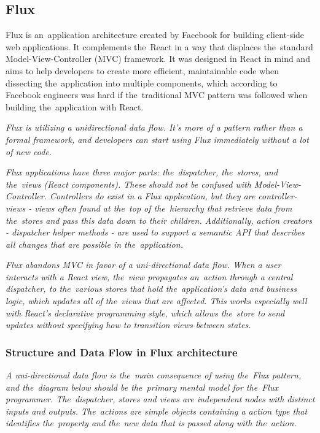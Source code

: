 \subsection{Flux}
Flux is an~application architecture created by Facebook for building client-side web applications. It complements the~React in a way that displaces the~standard Model-View-Controller (MVC) framework. It was designed in React in mind and aims to help developers to create more efficient, maintainable code when dissecting the~application into multiple components, which according to Facebook engineers was hard if the~traditional MVC pattern was followed when building the~application with React.\citep{gackenheimer}

\textsl{Flux is utilizing a unidirectional data flow. It's more of a pattern rather than a formal framework, and developers can start using Flux immediately without a lot of new code.} \citep{flux}

\textsl{Flux applications have three major parts: the~dispatcher, the~stores, and the~views (React components). These should not be confused with Model-View-Controller. Controllers do exist in a Flux application, but they are controller-views - views often found at the~top of the~hierarchy that retrieve data from the~stores and pass this data down to their children. Additionally, action creators - dispatcher helper methods - are used to support a semantic API that describes all changes that are possible in the~application.} \citep{flux}

\textsl{Flux abandons MVC in favor of a uni-directional data flow. When a user interacts with a React view, the~view propagates an~action through a central dispatcher, to the~various stores that hold the~application's data and business logic, which updates all of the~views that are affected. This works especially well with React's declarative programming style, which allows the~store to send updates without specifying how to transition views between states.} \citep{flux}

\subsubsection{Structure and Data Flow in Flux architecture}
\textsl{A uni-directional data flow is the~main consequence of using the~Flux pattern, and the~diagram below should be the~primary mental model for the~Flux programmer. The~dispatcher, stores and views are independent nodes with distinct inputs and outputs. The~actions are simple objects containing a action type that identifies the~property and the~new data that is passed along with the~action.} \citep{flux}

